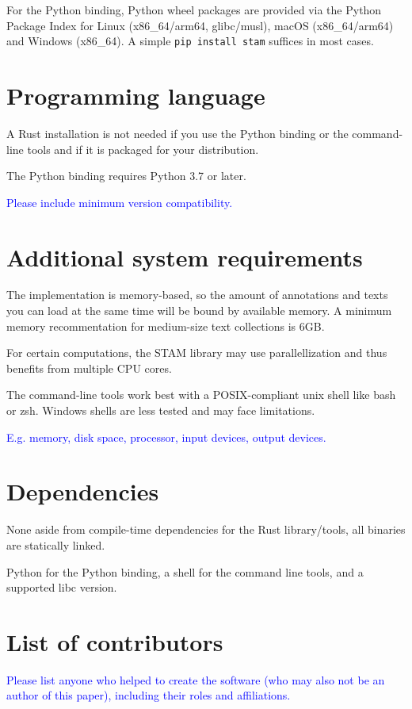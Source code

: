 \documentclass{jors}
\begin{document}
For the Python binding, Python wheel packages are provided via the Python Package Index for Linux (x86_64/arm64, glibc/musl), macOS (x86_64/arm64) and Windows (x86_64).
A simple \texttt{pip install stam} suffices in most cases.

\section*{Programming language}

A Rust installation is not needed if you use the Python binding or the command-line tools and if it is packaged for your distribution.

The Python binding requires Python 3.7 or later. 

\textcolor{blue}{Please include minimum version compatibility.}

\section*{Additional system requirements}

The implementation is memory-based, so the amount of annotations and texts you can load at the same time will be bound by available memory. A minimum memory recommentation for medium-size text collections is 6GB.

For certain computations, the STAM library may use parallellization and thus benefits from multiple CPU cores.

The command-line tools work best with a POSIX-compliant unix shell like bash or zsh. Windows shells are less tested and may face limitations. 

\textcolor{blue}{E.g. memory, disk space, processor, input devices, output devices.}

\section*{Dependencies}

None aside from compile-time dependencies for the Rust library/tools, all binaries are statically linked.

Python for the Python binding, a shell for the command line tools, and a supported libc version.

\section*{List of contributors}

\textcolor{blue}{Please list anyone who helped to create the software (who may also not be an author of this paper), including their roles and affiliations.}
\end{document}
